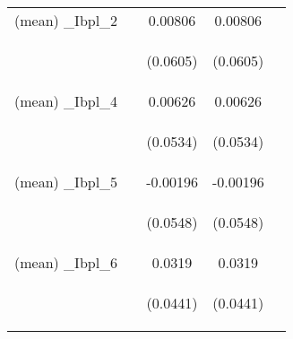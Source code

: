 \documentclass[]{article}
\begin{document}
\begin{center}
\begin{tabular}{lcccc}
(mean) \_Ibpl\_2 &  & 0.00806 & 0.00806 &  \\
\vspace{4pt} & \begin{footnotesize}\end{footnotesize} & \begin{footnotesize}(0.0605)\end{footnotesize} & \begin{footnotesize}(0.0605)\end{footnotesize} & \begin{footnotesize}\end{footnotesize} \\
(mean) \_Ibpl\_4 &  & 0.00626 & 0.00626 &  \\
\vspace{4pt} & \begin{footnotesize}\end{footnotesize} & \begin{footnotesize}(0.0534)\end{footnotesize} & \begin{footnotesize}(0.0534)\end{footnotesize} & \begin{footnotesize}\end{footnotesize} \\
(mean) \_Ibpl\_5 &  & -0.00196 & -0.00196 &  \\
\vspace{4pt} & \begin{footnotesize}\end{footnotesize} & \begin{footnotesize}(0.0548)\end{footnotesize} & \begin{footnotesize}(0.0548)\end{footnotesize} & \begin{footnotesize}\end{footnotesize} \\
(mean) \_Ibpl\_6 &  & 0.0319 & 0.0319 &  \\
\vspace{4pt} & \begin{footnotesize}\end{footnotesize} & \begin{footnotesize}(0.0441)\end{footnotesize} & \begin{footnotesize}(0.0441)\end{footnotesize} & \begin{footnotesize}\end{footnotesize} \\

\end{tabular}
\end{center}
\end{document}
